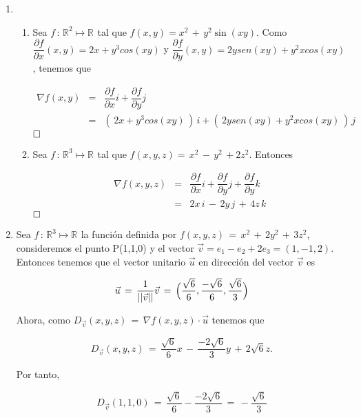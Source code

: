\documentclass[12pt]{article}
\newcommand{\Rn}[1]{\mathbb{R}^{#1}}
\begin{document}
	\begin{enumerate}
	    \item 
	    \begin{enumerate}
	        \item Sea $f \,:\,  \Rn{2} \mapsto \Rn{}$ tal que $f(x,y) = x^{2} \, + \, y^{2} \sin(xy)$. Como \linebreak $ \dfrac{\partial f }{\partial x} (x,y) = 2x + y^{3} cos(xy)$ y $\dfrac{\partial f}{\partial y} (x,y) = 2y sen(xy) + y^{2} x cos(xy)$, tenemos que 
	    
	    \begin{eqnarray*}
	        \nabla f (x,y) & = & \dfrac{\partial f }{\partial x} i + \dfrac{\partial f}{\partial y} j \\[0.2 cm]
	        & = & (\,2x + y^{3} cos(xy)\,) \, i + (\,2y sen(xy) + y^{2} x cos(xy)\,) \, j
	    \end{eqnarray*}
	  $\hfill \square$
	  
	  \item Sea $f \, :\, \Rn{3} \mapsto \Rn{}$ tal que $f(x,y,z) =\, x^{2} \, - \, y^{2} \, +2z^{2}$. Entonces
	  
	  \begin{eqnarray*}
	  \nabla f(x,y,z) & = & \dfrac{\partial f }{\partial x} i + \dfrac{\partial f}{\partial y} j + \dfrac{\partial f}{\partial y} k \\[0.2 cm]
	  & = & 2x \,i \, - \, 2y \, j \, + \, 4z \, k
	  \end{eqnarray*}
	  $\hfill \square$
	    \end{enumerate}
	  
	  \item Sea $f \, : \, \Rn{3} \mapsto \Rn{}$ la función definida por $f(x,y,z) \, = \, x^{2} \, + \, 2y^{2} \, + \, 3z^{2} $, consideremos el punto P(1,1,0) y el vector $\vec{v} = e_{1} - e_{2} + 2e_{3} = (1, -1, 2)$. Entonces tenemos que el vector unitario $\vec{u}$ en dirección del vector $\vec{v}$ es 
	  
	  $$ \vec{u} \, = \, \dfrac{1}{|| \vec{v}||} \vec{v}\, = \, \Bigl( \dfrac{\sqrt{6}}{6}, \dfrac{- \sqrt{6}}{6}, \dfrac{\sqrt{6}}{3} \Bigr) $$
	  
	  Ahora, como $D_{\vec{v}}(x,y,z) \, = \, \nabla f(x,y,z) \cdot \vec{u}$ tenemos que 
	  
	  $$  D_{\vec{v}}(x,y,z) \, = \, \dfrac{\sqrt{6}}{6} x \, - \, \dfrac{- 2\sqrt{6}}{3} y \, + \, 2 \sqrt{6}z.$$
	  
	  Por tanto,
	  
	  $$ D_{\vec{v}}(1,1,0) \, = \,  \dfrac{\sqrt{6}}{6} - \dfrac{- 2\sqrt{6}}{3} \, = \, - \dfrac{\sqrt{6}}{3} $$
	  

\end{enumerate}
\end{document}
